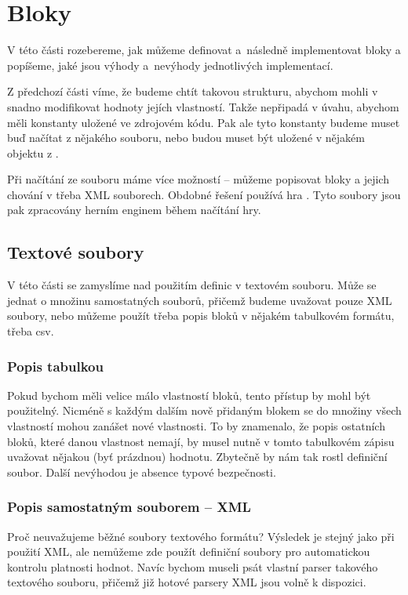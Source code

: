 
\section{Bloky}

V této části rozebereme, jak můžeme definovat a~následně implementovat bloky a popíšeme, jaké jsou výhody a~nevýhody jednotlivých implementací.

Z předchozí části víme, že budeme chtít takovou strukturu, abychom mohli v \UE{} snadno modifikovat hodnoty jejích vlastností. Takže nepřipadá v úvahu, abychom měli konstanty uložené ve zdrojovém kódu. Pak ale tyto konstanty budeme muset buď načítat z nějakého souboru, nebo budou muset být uložené v nějakém objektu z \UE{}.

Při načítání ze souboru máme více možností -- můžeme popisovat bloky a jejich chování v třeba XML souborech. Obdobné řešení používá hra \ME{}. Tyto soubory jsou pak zpracovány herním enginem během načítání hry. 

\subsection{Textové soubory}
V této části se zamyslíme nad použitím definic v textovém souboru. Může se jednat o množinu samostatných souborů, přičemž budeme uvažovat pouze XML soubory, nebo můžeme použít třeba popis bloků v nějakém tabulkovém formátu, třeba csv.

\subsubsection{Popis tabulkou}
Pokud bychom měli velice málo vlastností bloků, tento přístup by mohl být použitelný. Nicméně s každým dalším nově přidaným blokem se do množiny všech vlastností mohou zanášet nové vlastnosti.  To by znamenalo, že popis ostatních bloků, které danou vlastnost nemají, by musel nutně v tomto tabulkovém zápisu uvažovat nějakou (byť prázdnou) hodnotu. Zbytečně by nám tak rostl definiční soubor. Další nevýhodou je absence typové bezpečnosti. 

\subsubsection{Popis samostatným souborem -- XML}
Proč neuvažujeme běžné soubory textového formátu? Výsledek je stejný jako při použití XML, ale nemůžeme zde použít definiční soubory pro automatickou kontrolu platnosti hodnot. Navíc bychom museli psát vlastní parser takového textového souboru, přičemž již hotové parsery XML jsou volně k dispozici. 

